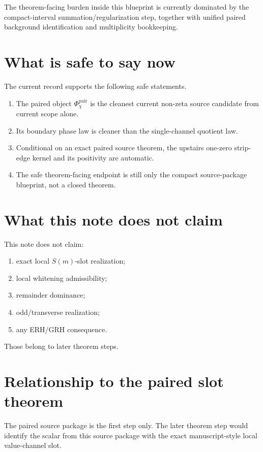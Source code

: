 \documentclass[11pt]{article}
\begin{document}
The theorem-facing burden inside this blueprint is currently dominated by the
compact-interval summation/regularization step, together with unified paired
background identification and multiplicity bookkeeping.

\section{What is safe to say now}

The current record supports the following safe statements.

\begin{enumerate}
\item The paired object \(\Phi_\chi^{\mathrm{pair}}\) is the cleanest current
non-zeta source candidate from current scope alone.
\item Its boundary phase law is cleaner than the single-channel quotient law.
\item Conditional on an exact paired source theorem, the upstairs one-zero
strip-edge kernel and its positivity are automatic.
\item The safe theorem-facing endpoint is still only the compact source-package
blueprint, not a closed theorem.
\end{enumerate}

\section{What this note does not claim}

This note does not claim:

\begin{enumerate}
\item exact local \(S(m)\)-slot realization;
\item local whitening admissibility;
\item remainder dominance;
\item odd/transverse realization;
\item any ERH/GRH consequence.
\end{enumerate}

Those belong to later theorem steps.

\section{Relationship to the paired slot theorem}

The paired source package is the first step only. The later theorem step would
identify the scalar from this source package with the exact manuscript-style
local value-channel slot.
\end{document}
